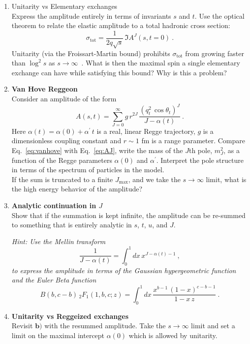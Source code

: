 \begin{enumerate}
\item {Unitarity vs Elementary exchanges} \\
Express the amplitude entirely in terms of invariants $s$ and $t$. Use the optical theorem to relate the elastic amplitude to a total hadronic cross section:
\begin{equation}
    \sigma_\text{tot} = \frac{1}{2q\sqrt{s}} \, \Im A^J(s,t=0)~.
\end{equation}
Unitarity (via the Froissart-Martin bound) prohibits $\sigma_\text{tot}$ from growing faster than $\log^2 s$ as $s\to\infty$~. What is then the maximal spin a single elementary exchange can have while satisfying this bound? Why is this a problem?

\item \textbf{Van Hove Reggeon} \\
Consider an amplitude of the form 
    \begin{equation}
        \label{eq:vanhove}
        A(s,t) = \sum_{J=0}^\infty g \, r^{2J} \, \frac{ (q_t^2 \, \cos\theta_t)^J}{J- \alpha(t)} ~.
    \end{equation}
Here $\alpha(t) = \alpha(0) + \alpha^\prime \, t$ is a real, linear Regge trajectory, $g$ is a dimensionless coupling constant and $r \sim 1$ fm is a range parameter. 
Compare Eq.~\ref{eq:vanhove} with Eq.~\ref{eq:AJ}, write the mass of the $J$th pole, $m_J^2$, as a function of the Regge parameters $\alpha(0)$ and $\alpha^\prime$. Interpret the pole structure in terms of the spectrum of particles in the model. 
\\

\noindent If the sum is truncated to a finite $J_\text{max}$, and we take the $s\to \infty$ limit, what is the high energy behavior of the amplitude? 

\item \textbf{Analytic continuation in $J$} \\
Show that if the summation is kept infinite, the amplitude can be re-summed to something that is entirely analytic in $s$, $t$, $u$, and $J$. 

\noindent \textit{Hint: Use the Mellin transform
    \begin{equation}
        \frac{1}{J-\alpha(t)} = \int_0^1 dx \, x^{J-\alpha(t) - 1} ~,
    \end{equation}
to express the amplitude in terms of the Gaussian hypergeometric function and the Euler Beta function
    \begin{equation}
        B(b, c-b) \, _2F_1(1, b, c; z) =  \int_0^1 dx \, \frac{ x^{b-1} \, (1-x)^{c-b-1}}{1-x \, z} ~. 
    \end{equation}
}
\item \textbf{Unitarity vs Reggeized exchanges} \\
Revisit $\mathbf{b)}$ with the resummed amplitude. Take the $s\to\infty$ limit and set a limit on the maximal intercept $\alpha(0)$ which is allowed by unitarity.  


\end{enumerate}
